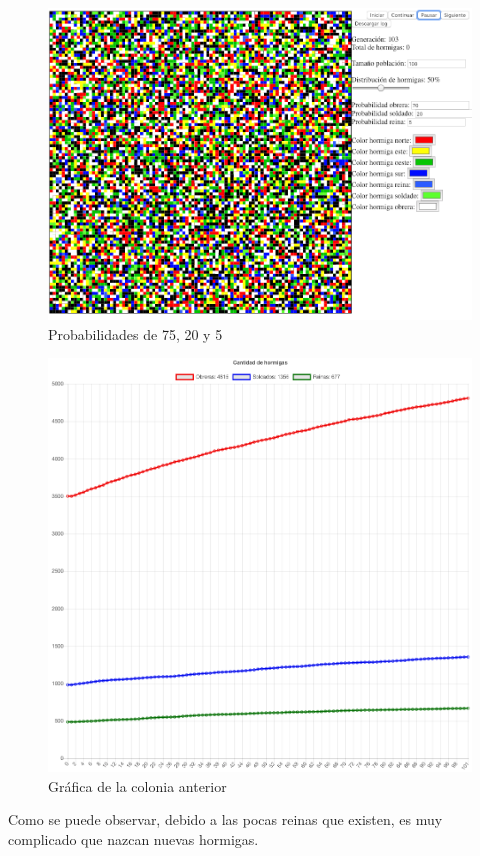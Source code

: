 		\begin{figure}[H]
			\begin{center}
				\includegraphics[scale=.3]{HL/img/mod3-1.png}
				\caption{Probabilidades de 75, 20 y 5}
				\label{fig:hl1}
			\end{center}
		\end{figure}

		\begin{figure}[H]
			\begin{center}
				\includegraphics[scale=.24]{HL/img/mod3-2.png}
				\caption{Gráfica de la colonia anterior}
				\label{fig:hl1}
			\end{center}
		\end{figure}

		Como se puede observar, debido a las pocas reinas que existen, es muy complicado que nazcan nuevas hormigas.
